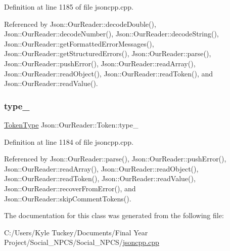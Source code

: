 Definition at line 1185 of file jsoncpp.\+cpp.



Referenced by Json\+::\+Our\+Reader\+::decode\+Double(), Json\+::\+Our\+Reader\+::decode\+Number(), Json\+::\+Our\+Reader\+::decode\+String(), Json\+::\+Our\+Reader\+::get\+Formatted\+Error\+Messages(), Json\+::\+Our\+Reader\+::get\+Structured\+Errors(), Json\+::\+Our\+Reader\+::parse(), Json\+::\+Our\+Reader\+::push\+Error(), Json\+::\+Our\+Reader\+::read\+Array(), Json\+::\+Our\+Reader\+::read\+Object(), Json\+::\+Our\+Reader\+::read\+Token(), and Json\+::\+Our\+Reader\+::read\+Value().

\mbox{\label{class_json_1_1_our_reader_1_1_token_abe7d858530396fa7e1293f7a579880ed}} 
\subsubsection{\texorpdfstring{type\+\_\+}{type\_}}
{\footnotesize\ttfamily \hyperlink{class_json_1_1_our_reader_a15116f7276ddf1e7a2cc3cbefa884dcc}{Token\+Type} Json\+::\+Our\+Reader\+::\+Token\+::type\+\_\+}



Definition at line 1184 of file jsoncpp.\+cpp.



Referenced by Json\+::\+Our\+Reader\+::parse(), Json\+::\+Our\+Reader\+::push\+Error(), Json\+::\+Our\+Reader\+::read\+Array(), Json\+::\+Our\+Reader\+::read\+Object(), Json\+::\+Our\+Reader\+::read\+Token(), Json\+::\+Our\+Reader\+::read\+Value(), Json\+::\+Our\+Reader\+::recover\+From\+Error(), and Json\+::\+Our\+Reader\+::skip\+Comment\+Tokens().



The documentation for this class was generated from the following file\+:\begin{DoxyCompactItemize}
\item 
C\+:/\+Users/\+Kyle Tuckey/\+Documents/\+Final Year Project/\+Social\+\_\+\+N\+P\+C\+S/\+Social\+\_\+\+N\+P\+C\+S/\hyperlink{jsoncpp_8cpp}{jsoncpp.\+cpp}\end{DoxyCompactItemize}
